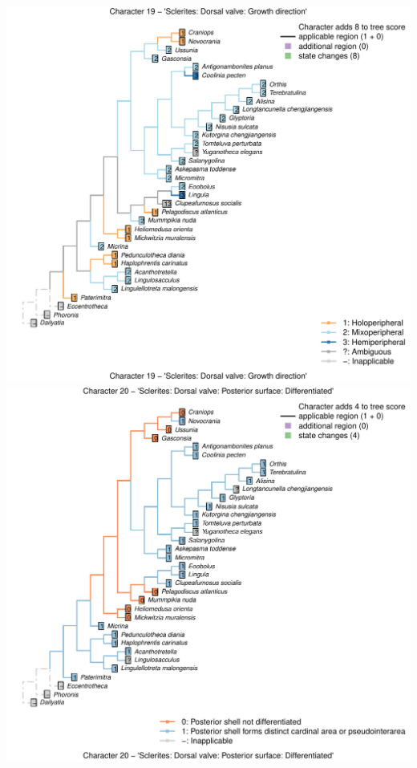 \documentclass[]{book}
\theoremstyle{definition}
\theoremstyle{definition}
\theoremstyle{definition}
\theoremstyle{remark}
\begin{document}
\includegraphics{Brachiopod_phylogeny_files/figure-latex/unnamed-chunk-4-19.pdf}
\includegraphics{Brachiopod_phylogeny_files/figure-latex/unnamed-chunk-4-20.pdf}
\end{document}

